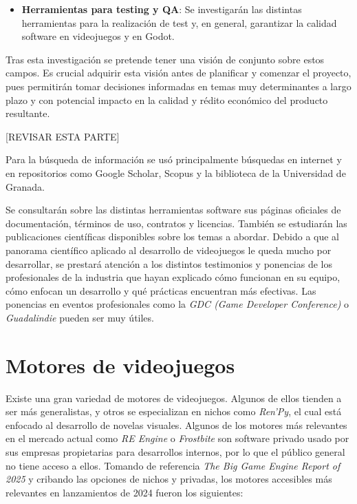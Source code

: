 \begin{itemize}
    \item \textbf{Herramientas para testing y QA}: Se investigarán las distintas herramientas para la realización de test y, en general, garantizar la calidad software en videojuegos y en Godot.

\end{itemize} 

Tras esta investigación se pretende tener una visión de conjunto sobre estos campos. Es crucial adquirir esta visión antes de planificar y comenzar el proyecto, pues permitirán tomar decisiones informadas en temas muy determinantes a largo plazo y con potencial impacto en la calidad y rédito económico del producto resultante.


[REVISAR ESTA PARTE]


Para la búsqueda de información se usó principalmente búsquedas en internet y en repositorios como Google Scholar, Scopus y la biblioteca de la Universidad de Granada.

Se consultarán sobre las distintas herramientas software sus páginas oficiales de documentación, términos de uso, contratos y licencias. También se estudiarán las publicaciones científicas disponibles sobre los temas a abordar. Debido a que al panorama científico aplicado al desarrollo de videojuegos le queda mucho por desarrollar, se prestará atención a los distintos testimonios y ponencias de los profesionales de la industria que hayan explicado cómo funcionan en su equipo, cómo enfocan un desarrollo y qué prácticas encuentran más efectivas. Las ponencias en eventos profesionales como la \textit{GDC (Game Developer Conference)} o \textit{Guadalindie} pueden ser muy útiles.

\section{Motores de videojuegos}

Existe una gran variedad de motores de videojuegos. Algunos de ellos tienden a ser más generalistas, y otros se especializan en nichos como \textit{Ren'Py}\cite{renpy}, el cual está enfocado al desarrollo de novelas visuales. Algunos de los motores más relevantes en el mercado actual como \textit{RE Engine} o \textit{Frostbite} son software privado usado por sus empresas propietarias para desarrollos internos, por lo que el público general no tiene acceso a ellos. Tomando de referencia \textit{The Big Game Engine Report of 2025}\cite{game-engine-report} y cribando las opciones de nichos y privadas, los motores accesibles más relevantes en lanzamientos de 2024 fueron los siguientes:

